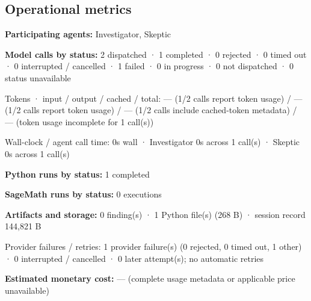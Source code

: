 \documentclass[11pt]{article}
\begin{document}
\subsection{Operational metrics}
\textbf{Participating agents:} Investigator, Skeptic\par
\textbf{Model calls by status:} 2 dispatched · 1 completed · 0 rejected · 0 timed out · 0 interrupted / cancelled · 1 failed · 0 in progress · 0 not dispatched · 0 status unavailable\par
Tokens · input / output / cached / total: — (1/2 calls report token usage) / — (1/2 calls report token usage) / — (1/2 calls include cached-token metadata) / — (token usage incomplete for 1 call(s))\par
Wall-clock / agent call time: 0s wall · Investigator 0s across 1 call(s) · Skeptic 0s across 1 call(s)\par
\textbf{Python runs by status:} 1 completed\par
\textbf{SageMath runs by status:} 0 executions\par
\textbf{Artifacts and storage:} 0 finding(s) · 1 Python file(s) (268 B) · session record 144,821 B\par
Provider failures / retries: 1 provider failure(s) (0 rejected, 0 timed out, 1 other) · 0 interrupted / cancelled · 0 later attempt(s); no automatic retries\par
\textbf{Estimated monetary cost:} — (complete usage metadata or applicable price unavailable)\par
\end{document}
